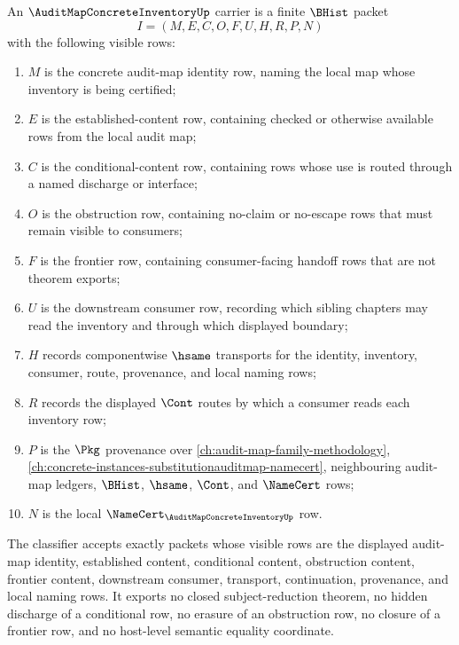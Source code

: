\begin{definition}
\label{def:audit-map-concrete-inventory-carrier}
An $\AuditMapConcreteInventoryUp$ carrier is a finite $\BHist$ packet
$$
I=(M,E,C,O,F,U,H,R,P,N)
$$
with the following visible rows:
\begin{enumerate}
\item $M$ is the concrete audit-map identity row, naming the local map whose inventory is being certified;
\item $E$ is the established-content row, containing checked or otherwise available rows from the local audit map;
\item $C$ is the conditional-content row, containing rows whose use is routed through a named discharge or interface;
\item $O$ is the obstruction row, containing no-claim or no-escape rows that must remain visible to consumers;
\item $F$ is the frontier row, containing consumer-facing handoff rows that are not theorem exports;
\item $U$ is the downstream consumer row, recording which sibling chapters may read the inventory and through which displayed boundary;
\item $H$ records componentwise $\hsame$ transports for the identity, inventory, consumer, route, provenance, and local naming rows;
\item $R$ records the displayed $\Cont$ routes by which a consumer reads each inventory row;
\item $P$ is the $\Pkg$ provenance over \autoref{ch:audit-map-family-methodology}, \autoref{ch:concrete-instances-substitutionauditmap-namecert}, neighbouring audit-map ledgers, $\BHist$, $\hsame$, $\Cont$, and $\NameCert$ rows;
\item $N$ is the local $\NameCert_{\AuditMapConcreteInventoryUp}$ row.
\end{enumerate}
The classifier accepts exactly packets whose visible rows are the displayed audit-map identity, established content, conditional content, obstruction content, frontier content, downstream consumer, transport, continuation, provenance, and local naming rows. It exports no closed subject-reduction theorem, no hidden discharge of a conditional row, no erasure of an obstruction row, no closure of a frontier row, and no host-level semantic equality coordinate.
\end{definition}


